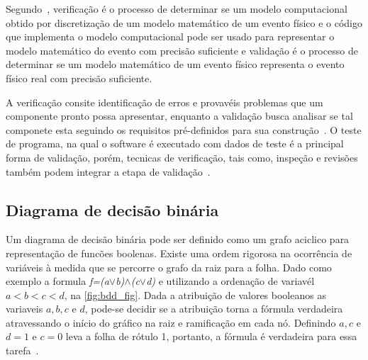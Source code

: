 \par
Segundo~\cite{sargent2005verification}, verificação é o processo de determinar se um modelo computacional obtido por discretização de um modelo matemático de um evento físico e o código que implementa o modelo computacional pode ser usado para representar o modelo matemático do evento com precisão suficiente e validação é o processo de determinar se um modelo matemático de um evento físico representa o evento físico real com precisão suficiente.

\par
A verificação consite identificação de erros e provavéis problemas que um componente pronto possa apresentar, enquanto a validação busca analisar se tal componete esta seguindo os requisitos pré-definidos para sua construção~\cite{koscianski2007qualidade}. O teste de programa, na qual o software  é executado com dados de teste é a principal forma de validação, porém, tecnicas de verificação, tais como, inspeção e revisões também podem integrar a etapa de validação~\cite{sommerville2011engenharia}.

\subsection{Diagrama de decisão binária}
Um diagrama de decisão binária pode ser definido como um grafo aciclico para representação de funcões boolenas. Existe uma ordem rigorosa na ocorrência de variáveis à medida que se percorre o grafo da raiz para a folha. Dado como exemplo a formula \textit{f=(a$\lor$b)$\land$(c$\lor$d)} e utilizando a ordenação de variavél $a < b < c < d$, na \autoref{fig:bdd_fig}. Dada a atribuição de valores booleanos as variaveis $a, b, c$ e $d$, pode-se decidir se a atribuição torna a fórmula verdadeira atravessando o início do gráfico na raiz e ramificação em cada nó. Definindo $a,c$ e $d = 1$ e $c = 0$ leva a folha de rótulo 1, portanto, a fórmula é verdadeira para essa tarefa~\cite{clarke1994model}.

